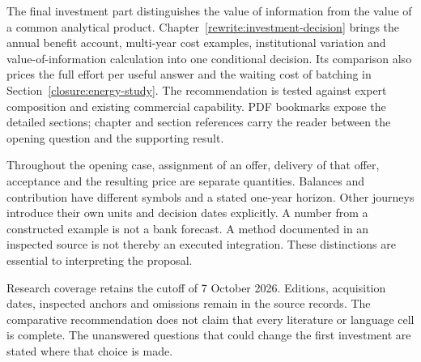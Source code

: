 The final investment part distinguishes the value of information from the
value of a common analytical product. Chapter~\ref{rewrite:investment-decision}
brings the annual benefit account, multi-year cost examples, institutional
variation and value-of-information calculation into one conditional decision.
Its comparison also prices the full effort per useful answer and the
waiting cost of batching in Section~\ref{closure:energy-study}. The
recommendation is tested against expert composition and existing
commercial capability. PDF bookmarks expose the detailed sections; chapter
and section references carry the reader between the opening question and
the supporting result.

Throughout the opening case, assignment of an offer, delivery of that offer,
acceptance and the resulting price are separate quantities. Balances and
contribution have different symbols and a stated one-year horizon. Other
journeys introduce their own units and decision dates explicitly. A number
from a constructed example is not a bank forecast. A method documented in an
inspected source is not thereby an executed integration. These distinctions
are essential to interpreting the proposal.

Research coverage retains the cutoff of 7 October 2026. Editions, acquisition
dates, inspected anchors and omissions remain in the source records. The
comparative recommendation does not claim that every literature or language
cell is complete. The unanswered questions that could change the first
investment are stated where that choice is made.
